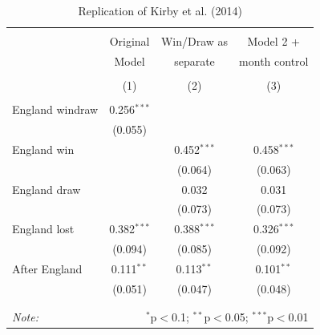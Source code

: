 \documentclass[12pt, letterpaper]{article}
\begin{document}
\begin{table}
\centering
 \caption{Replication of Kirby et al. (2014)}
  \label{kirbyrep}
\begin{tabular}{@{\extracolsep{5pt}}lccc} 
\\[-1.8ex]\hline 
\hline \\[-1.8ex] 
 & Original  & Win/Draw as & Model 2 + \\ 
  &  Model & separate & month control \\ 
\\[-1.8ex] & (1) & (2) & (3)\\ 
\hline \\[-1.8ex] 
 England windraw & 0.256$^{***}$ &  &  \\ 
  & (0.055) &  &  \\ 
  England win &  & 0.452$^{***}$ & 0.458$^{***}$ \\ 
  &  & (0.064) & (0.063) \\ 
  England draw &  & 0.032 & 0.031 \\ 
  &  & (0.073) & (0.073) \\ 
  England lost & 0.382$^{***}$ & 0.388$^{***}$ & 0.326$^{***}$ \\ 
  & (0.094) & (0.085) & (0.092) \\ 
  After England & 0.111$^{**}$ & 0.113$^{**}$ & 0.101$^{**}$ \\ 
  & (0.051) & (0.047) & (0.048) \\ 
 \hline \\[-1.8ex] 
\hline \\[-1.8ex] 
\textit{Note:}  & \multicolumn{3}{r}{$^{*}$p$<$0.1; $^{**}$p$<$0.05; $^{***}$p$<$0.01} \\ 
\end{tabular} 
\end{table}

\newpage
\end{document}
